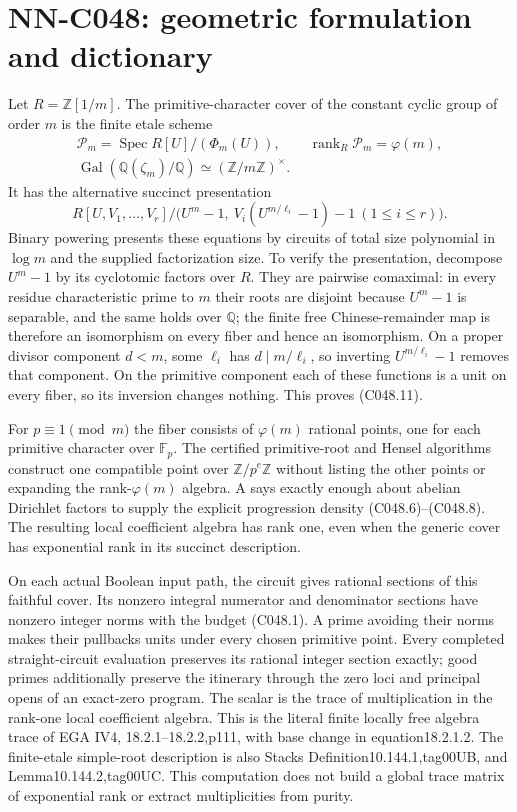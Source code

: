 \section{NN-C048: geometric formulation and dictionary}
\begin{geometricstatement}[NN-C048]
Let $R=\mathbb Z[1/m]$. The primitive-character cover of the
constant cyclic group of order $m$ is the finite etale scheme
\[
 \begin{gathered}
 \mathcal P_m=\operatorname{Spec}R[U]/(\Phi_m(U)),
 \qquad \operatorname{rank}_R\mathcal P_m=\varphi(m),\\
 \operatorname{Gal}(\mathbb Q(\zeta_m)/\mathbb Q)
                   \simeq(\mathbb Z/m\mathbb Z)^\times.
 \end{gathered}
\]
It has the alternative succinct presentation
\[
 R[U,V_1,\ldots,V_r]\big/
 \big(U^m-1,\ V_i(U^{m/\ell_i}-1)-1\ (1\le i\le r)\big).
                                                               \tag{C048.11}
\]
Binary powering presents these equations by circuits of total
size polynomial in $\log m$ and the supplied factorization size.
To verify the presentation, decompose $U^m-1$ by its cyclotomic
factors over $R$. They are pairwise comaximal: in every residue
characteristic prime to $m$ their roots are disjoint because
$U^m-1$ is separable, and the same holds over $\mathbb Q$; the
finite free Chinese-remainder map is therefore an isomorphism
on every fiber and hence an isomorphism. On a proper divisor
component $d<m$, some $\ell_i$ has $d\mid m/\ell_i$, so inverting
$U^{m/\ell_i}-1$ removes that component. On the primitive
component each of these functions is a unit on every fiber,
so its inversion changes nothing. This proves (C048.11).

For $p\equiv1\pmod m$ the fiber consists of $\varphi(m)$
rational points, one for each primitive character over
$\mathbb F_p$. The certified primitive-root and Hensel algorithms
construct one compatible point over $\mathbb Z/p^e\mathbb Z$
without listing the other points or expanding the rank-$\varphi(m)$
algebra. A says exactly enough about abelian Dirichlet factors
to supply the explicit progression density (C048.6)--(C048.8).
The resulting local coefficient algebra has rank one, even
when the generic cover has exponential rank in its succinct
description.

On each actual Boolean input path, the circuit gives rational
sections of this faithful cover. Its nonzero integral numerator
and denominator sections have nonzero integer norms with the
budget (C048.1). A prime avoiding their norms makes their
pullbacks units under every chosen primitive point. Every
completed straight-circuit evaluation preserves its rational
integer section exactly; good primes additionally preserve the
itinerary through the zero loci and principal opens of an
exact-zero program. The scalar is the trace of multiplication
in the rank-one local coefficient algebra. This is the literal
finite locally free algebra trace of EGA IV4,
18.2.1--18.2.2,p111, with base change in equation18.2.1.2.
The finite-etale simple-root description is also Stacks
Definition10.144.1,tag00UB, and Lemma10.144.2,tag00UC.
This computation does not build a global trace matrix of
exponential rank or extract multiplicities from purity.


\end{geometricstatement}

